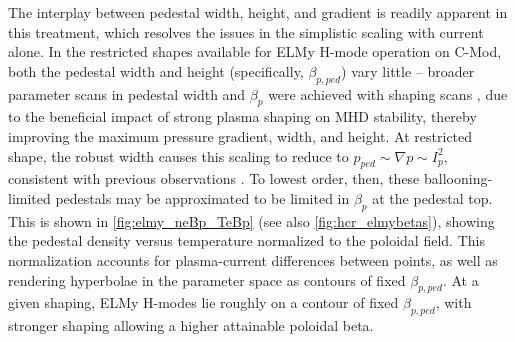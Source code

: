 \begin{figure}[t]
 \pushtooutside
\end{figure}

The interplay between pedestal width, height, and gradient is readily apparent in this treatment, which resolves the issues in the simplistic scaling with current alone.  In the restricted shapes available for ELMy H-mode operation on C-Mod, both the pedestal width and height (specifically, $\beta_{p,ped}$) vary little -- broader parameter scans in pedestal width and $\beta_p$ were achieved with shaping scans \cite{Maggi2010}, due to the beneficial impact of strong plasma shaping on MHD stability, thereby improving the maximum pressure gradient, width, and height.  At restricted shape, the robust width causes this scaling to reduce to $p_{ped} \sim \nabla p \sim I_p^2$, consistent with previous observations \cite{Hughes2002}.  To lowest order, then, these ballooning-limited pedestals may be approximated to be limited in $\beta_p$ at the pedestal top.  This is shown in \cref{fig:elmy_neBp_TeBp} (see also \cref{fig:hcr_elmybetas}), showing the pedestal density versus temperature normalized to the poloidal field.  This normalization accounts for plasma-current differences between points, as well as rendering hyperbolae in the parameter space as contours of fixed $\beta_{p,ped}$.  At a given shaping, ELMy H-modes lie roughly on a contour of fixed $\beta_{p,ped}$, with stronger shaping allowing a higher attainable poloidal beta.

